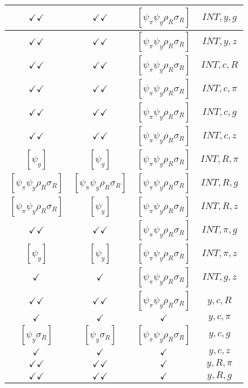 \documentclass[a4paper,10pt]{article}
\begin{document}
\begin{longtable}{|c|c|c|c|}
\hline
$\checkmark\checkmark$ & $\checkmark\checkmark$ & $[\psi_\pi \psi_y \rho_R \sigma_R ]$ & ${INT},{y},{g}$ \\
\hline
$\checkmark\checkmark$ & $\checkmark\checkmark$ & $[\psi_\pi \psi_y \rho_R \sigma_R ]$ & ${INT},{y},{z}$ \\
\hline
$\checkmark\checkmark$ & $\checkmark\checkmark$ & $[\psi_\pi \psi_y \rho_R \sigma_R ]$ & ${INT},{c},{R}$ \\
\hline
$\checkmark\checkmark$ & $\checkmark\checkmark$ & $[\psi_\pi \psi_y \rho_R \sigma_R ]$ & ${INT},{c},{\pi}$ \\
\hline
$\checkmark\checkmark$ & $\checkmark\checkmark$ & $[\psi_\pi \psi_y \rho_R \sigma_R ]$ & ${INT},{c},{g}$ \\
\hline
$\checkmark\checkmark$ & $\checkmark\checkmark$ & $[\psi_\pi \psi_y \rho_R \sigma_R ]$ & ${INT},{c},{z}$ \\
\hline
$[\psi_y ]$ & $[\psi_y ]$ & $[\psi_\pi \psi_y \rho_R \sigma_R ]$ & ${INT},{R},{\pi}$ \\
\hline
$[\psi_\pi \psi_y \rho_R \sigma_R ]$ & $[\psi_\pi \psi_y \rho_R \sigma_R ]$ & $[\psi_\pi \psi_y \rho_R \sigma_R ]$ & ${INT},{R},{g}$ \\
\hline
$[\psi_\pi \psi_y \rho_R \sigma_R ]$ & $[\psi_y ]$ & $[\psi_\pi \psi_y \rho_R \sigma_R ]$ & ${INT},{R},{z}$ \\
\hline
$\checkmark\checkmark$ & $\checkmark\checkmark$ & $[\psi_\pi \psi_y \rho_R \sigma_R ]$ & ${INT},{\pi},{g}$ \\
\hline
$[\psi_y ]$ & $[\psi_y ]$ & $[\psi_\pi \psi_y \rho_R \sigma_R ]$ & ${INT},{\pi},{z}$ \\
\hline
$\checkmark$ & $\checkmark$ & $[\psi_\pi \psi_y \rho_R \sigma_R ]$ & ${INT},{g},{z}$ \\
\hline
$\checkmark\checkmark$ & $\checkmark\checkmark$ & $[\psi_\pi \psi_y \rho_R \sigma_R ]$ & ${y},{c},{R}$ \\
\hline
$\checkmark$ & $\checkmark$ & $\checkmark$ & ${y},{c},{\pi}$ \\
\hline
$[\psi_y \sigma_R ]$ & $[\psi_y \sigma_R ]$ & $[\psi_\pi \psi_y \rho_R \sigma_R ]$ & ${y},{c},{g}$ \\
\hline
$\checkmark$ & $\checkmark$ & $\checkmark$ & ${y},{c},{z}$ \\
\hline
$\checkmark\checkmark$ & $\checkmark\checkmark$ & $\checkmark$ & ${y},{R},{\pi}$ \\
\hline
$\checkmark\checkmark$ & $\checkmark\checkmark$ & $\checkmark$ & ${y},{R},{g}$ \\

\end{longtable}
\end{document}
